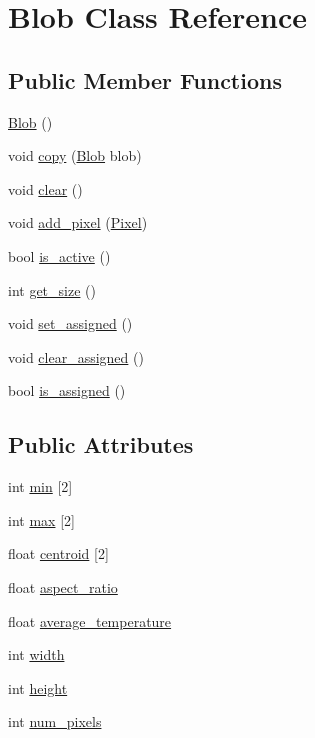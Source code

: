 \hypertarget{class_blob}{}\section{Blob Class Reference}
\label{class_blob}
\subsection*{Public Member Functions}
\begin{DoxyCompactItemize}
\item 
\hyperlink{class_blob_a6a0d29e3183e1458d1b9e6a5ca584826}{Blob} ()
\item 
void \hyperlink{class_blob_a8799d9f4067f8313a14abe6b6e95b94b}{copy} (\hyperlink{class_blob}{Blob} blob)
\item 
void \hyperlink{class_blob_a225d68a04864a856a1165e076df38492}{clear} ()
\item 
void \hyperlink{class_blob_a23782f7fe230bc94a2ddaf7e1a47035e}{add\+\_\+pixel} (\hyperlink{class_pixel}{Pixel})
\item 
bool \hyperlink{class_blob_aa5cd59a1f655612b00774c50a62227a2}{is\+\_\+active} ()
\item 
int \hyperlink{class_blob_a8305d9a0e1b4573e86347f669cb4a637}{get\+\_\+size} ()
\item 
void \hyperlink{class_blob_a6893c4a0491aa7978e82105cd9cd6b39}{set\+\_\+assigned} ()
\item 
void \hyperlink{class_blob_a5e11ee1b8ee8ee18dce8161e05576607}{clear\+\_\+assigned} ()
\item 
bool \hyperlink{class_blob_a7a8d479fca8f7f7ef1908e35911fc8ad}{is\+\_\+assigned} ()
\end{DoxyCompactItemize}
\subsection*{Public Attributes}
\begin{DoxyCompactItemize}
\item 
int \hyperlink{class_blob_a12342366f558050f8f19c0caaf83a49c}{min} \mbox{[}2\mbox{]}
\item 
int \hyperlink{class_blob_ac65f825c125a2d93eefae61b5602111d}{max} \mbox{[}2\mbox{]}
\item 
float \hyperlink{class_blob_a88923d04a5ddd83f95c4ce6dabc7e903}{centroid} \mbox{[}2\mbox{]}
\item 
float \hyperlink{class_blob_a636fb6a6b7ecefeedd3a3a0558d5091c}{aspect\+\_\+ratio}
\item 
float \hyperlink{class_blob_aed99c02ad613d5a723ebf926c357952d}{average\+\_\+temperature}
\item 
int \hyperlink{class_blob_af83c73533a368f2244c982af843f922a}{width}
\item 
int \hyperlink{class_blob_a799f7528e23e76180b4267fb0588a929}{height}
\item 
int \hyperlink{class_blob_a2970a2de48ad41c7ab03d7fad75d3250}{num\+\_\+pixels}
\end{DoxyCompactItemize}


